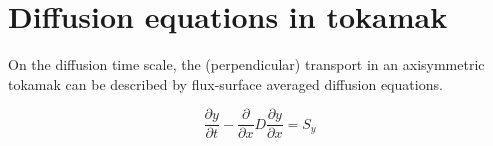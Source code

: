 \section{Diffusion equations in tokamak}

On the diffusion time scale, the (perpendicular) transport in an axisymmetric tokamak can be described by flux-surface averaged diffusion equations.

\[\frac{{\partial y}}{{\partial t}} - \frac{\partial }{{\partial x}}D\frac{{\partial y}}{{\partial x}} = {S_y}\]
